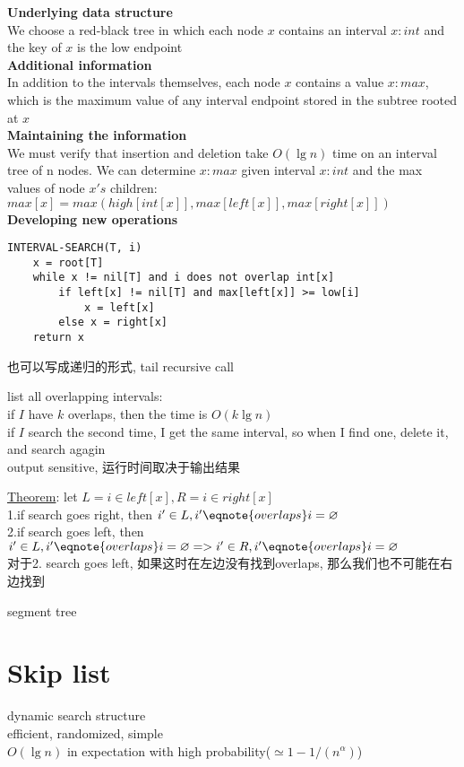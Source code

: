 \documentclass{article}
\begin{document}
\bigskip
\textbf{Underlying data structure}\\
We choose a red-black tree in which each node $x$ contains an interval $x:int$ and the key of $x$ is the low endpoint\\
\textbf{Additional information}\\
In addition to the intervals themselves, each node $x$ contains a value $x:max$, which is the maximum value of any interval endpoint stored in the subtree rooted at $x$\\
\textbf{Maintaining the information}\\
We must verify that insertion and deletion take $O(\lg n)$ time on an interval tree of n nodes. We can determine $x:max$ given interval $x:int$ and the max values of node $x's$ children:\\
$max[x] = max(high[int[x]], max[left[x]], max[right[x]])$\\
\textbf{Developing new operations}
\begin{verbatim}
INTERVAL-SEARCH(T, i)
    x = root[T]
    while x != nil[T] and i does not overlap int[x]
        if left[x] != nil[T] and max[left[x]] >= low[i]
            x = left[x]
        else x = right[x]
    return x
\end{verbatim}
也可以写成递归的形式, tail recursive call

\bigskip
\noindent list all overlapping intervals:\\
if $I$ have $k$ overlaps, then the time is $O(k\lg n)$\\
if $I$ search the second time, I get the same interval, so when I find one, delete it, and search agagin\\
output sensitive, 运行时间取决于输出结果

\bigskip
\noindent \underline{Theorem}: let $L = {i \in left[x]}, R = {i \in right[x]}$\\
1.if search goes right, then ${i' \in L, i' \eqnote{overlaps} i} = \varnothing$\\
2.if search goes left, then ${i' \in L, i' \eqnote{overlaps} i} = \varnothing => {i' \in R, i' \eqnote{overlaps} i} = \varnothing$\\
对于2. search goes left, 如果这时在左边没有找到overlaps, 那么我们也不可能在右边找到

\bigskip
segment tree

\section{Skip list}
dynamic search structure \\
efficient, randomized, simple\\
$O(\lg n)$ in expectation with high probability($\simeq 1 - 1/(n^{\alpha})$)
\end{document}
